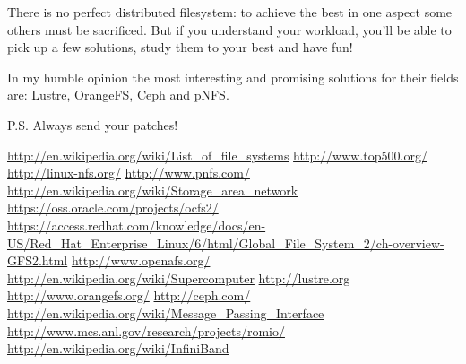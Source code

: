 \documentclass[10pt, a5paper]{article}
\begin{document}
There is no perfect distributed filesystem: to achieve the best in one aspect some others must be sacrificed. But if you understand your workload, you'll be able to pick up a few solutions, study them to your best and have fun!

In my humble opinion the most interesting and promising solutions for their fields are: Lustre\cite{bib10}, OrangeFS\cite{bib11}, Ceph\cite{bib12} and pNFS\cite{bib4}.

P.S. Always send your patches!

\begin{thebibliography}{9}
 {\href{http://en.wikipedia.org/wiki/List_of_file_systems}{http://en.wikipedia.org/wiki/List\_of\_file\_systems}}
 {\href{http://www.top500.org/}{http://www.top500.org/}}
 {\href{http://linux-nfs.org/}{http://linux-nfs.org/}}
 {\href{http://www.pnfs.com/}{http://www.pnfs.com/}}
 {\href{http://en.wikipedia.org/wiki/Storage_area_network}{http://en.wikipedia.org/wiki/Storage\_area\_network}}
 {\href{https://oss.oracle.com/projects/ocfs2/}{https://oss.oracle.com/projects/ocfs2/}}
 {\href{https://access.redhat.com/knowledge/docs/en-US/Red_Hat_Enterprise_Linux/6/html/Global_File_System_2/ch-overview-GFS2.html}{https://access.redhat.com/knowledge/docs/en-US/Red\_Hat\_Enterprise\_Linux/6/html/Global\_File\_System\_2/ch-overview-GFS2.html}}
 {\href{http://www.openafs.org/}{http://www.openafs.org/}}
 {\href{http://en.wikipedia.org/wiki/Supercomputer}{http://en.wikipedia.org/wiki/Supercomputer}}
 {\href{http://lustre.org/}{http://lustre.org}}
 {\href{http://www.orangefs.org/}{http://www.orangefs.org/}}
 {\href{http://ceph.com/}{http://ceph.com/}}
 {\href{http://en.wikipedia.org/wiki/Message_Passing_Interface}{http://en.wikipedia.org/wiki/Message\_Passing\_Interface}}
 {\href{http://www.mcs.anl.gov/research/projects/romio/}{http://www.mcs.anl.gov/research/projects/romio/}}
 {\href{http://en.wikipedia.org/wiki/InfiniBand}{http://en.wikipedia.org/wiki/InfiniBand}}\end{thebibliography}
\end{document}

